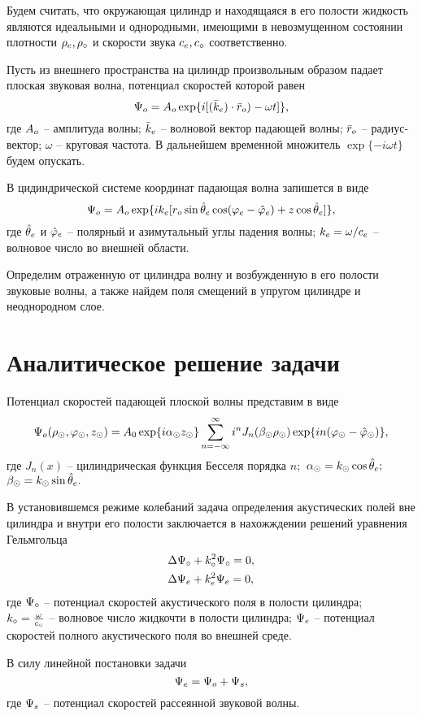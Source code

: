 Будем считать, что окружающая цилиндр и находящаяся в его полости жидкость являются идеальными и однородными, имеющими в невозмущенном состоянии плотности $\r\en, \r\c$ и скорости звука $c\en, c\c$ соответственно.

Пусть из внешнего пространства на цилиндр произвольным образом падает плоская звуковая волна, потенциал скоростей которой равен
$$\P\o=A\o \exp\{i[(\bar{k}\en)\cdot \bar{r}\o)-\omega t]\},$$
где $A\o$ -- амплитуда волны; $\bar{k}\en$ -- волновой вектор падающей волны; $\bar{r}\o$ -- радиус-вектор; $\omega$ -- круговая частота. В дальнейшем временной множитель $\exp\{-i\omega t\}$ будем опускать.

В цидиндрической системе координат падающая волна запишется в виде
$$\P\o=A\o\exp\{ik\en[r\o\sin{\hat{\theta}\en}\cos(\f\en-\hat{\f}\en)+z\cos\hat{\Q}\en]\},$$
где $\hat{\theta}\en$ и $\hat{\f}\en$ -- полярный и азимутальный углы падения волны; $k\en=\omega / c\en$ -- волновое число во внешней области.

Определим отраженную от цилиндра волну и возбужденную в его полости звуковые волны, а также найдем поля смещений в упругом цилиндре и неоднородном слое.

\newpage
\section{Аналитическое решение задачи}

Потенциал скоростей падающей плоской волны представим в виде
$$\P\o(\r\cyl, \f\cyl, z\cyl)=A_0\exp\{i\alpha\cyl z\cyl\}\sum_{n=-\infty}^{\infty}i^nJ_n(\beta\cyl \r\cyl)\exp\{in(\f\cyl-\hat\f\cyl)\},$$
где $J_n(x)$ -- цилиндрическая функция Бесселя порядка $n;$ $\alpha\cyl=k\cyl\cos\hat\theta\en;$ \\$\beta\cyl=k\cyl\sin\hat\theta\en.$

В установившемся режиме колебаний задача определения акустических полей вне цилиндра и внутри его полости заключается в нахожждении решений уравнения Гельмгольца
\begin{align}
&\Lap\P\c+k\c^2\P\c=0,\\
&\Lap\P\en+k\en^2\P\en=0\label{eq_gel_for_enviroment},
\end{align}
где $\P\c$ -- потенциал скоростей акустического поля в полости цилиндра;\\ $k\c=\frac{\omega}{c\c}$ -- волновое число жидкочти в полости цилиндра;
$\P\en$ -- потенциал скоростей полного акустического поля во внешней среде. 

В силу линейной постановки задачи
\begin{equation}
\P\en=\P\o+\P_s,
\end{equation}
где $\P_s$ -- потенциал скоростей рассеянной звуковой волны.

